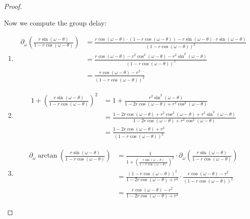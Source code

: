 \begin{proof}
\begin{enumerate}
              Now we compute the group delay:
              \begin{enumerate}[label = Step \arabic*., align = left]
                  \item
                        \begin{align*}
                            \partial_{\omega} \left(\frac{r \sin(\omega - \theta)}{1 - r \cos (\omega - \theta)} \right)
                             & = \frac{r \cos(\omega - \theta) \cdot (1 - r \cos(\omega - \theta)) - r\sin(\omega - \theta) \cdot r\sin(\omega - \theta)}{(1-r\cos(\omega - \theta))^2}
                            \\ &= \frac{r \cos(\omega - \theta) - r^2 \cos^2(\omega - \theta) - r^2 \sin^2(\omega - \theta)}{(1-r\cos(\omega - \theta))^2}
                            \\ &= \frac{r \cos(\omega - \theta) - r^2}{(1-r\cos(\omega - \theta))^2}
                        \end{align*}
                  \item
                        \begin{align*}
                            1 + \left(\frac{r \sin(\omega - \theta)}{1 - r \cos (\omega - \theta)} \right)^2
                             & = 1 + \frac{r^2 \sin^2(\omega - \theta)}{1 - 2r \cos (\omega - \theta) + r^2 \cos^2 (\omega - \theta)}
                            \\ &= \frac{1 - 2r \cos (\omega - \theta) + r^2 \cos^2 (\omega - \theta) + r^2 \sin^2(\omega - \theta)}{1 - 2r \cos (\omega - \theta) + r^2 \cos^2 (\omega - \theta)}
                            \\ &= \frac{1 - 2r \cos (\omega - \theta) + r^2}{(1 - r \cos (\omega - \theta))^2}
                        \end{align*}
                  \item
                        \begin{align*}
                            \partial_{\omega} \arctan \left(\frac{r \sin(\omega - \theta)}{1 - r \cos (\omega - \theta)}\right)
                             & = \frac{1}{1 + \left(\frac{r \sin(\omega - \theta)}{1 - r \cos (\omega - \theta)}\right)^2} \cdot \partial_{\omega} \left(\frac{r \sin(\omega - \theta)}{1 - r \cos (\omega - \theta)}\right)
                            \\ &= \frac{(1 - r \cos (\omega - \theta))^2}{1 - 2r \cos (\omega - \theta) + r^2} \cdot \frac{r \cos(\omega - \theta) - r^2}{(1 - r\cos(\omega - \theta))^2}
                            \\ &= \frac{r \cos(\omega - \theta) - r^2}{1 - 2r \cos (\omega - \theta) + r^2}

\end{align*}
\end{enumerate}
\end{enumerate}
\end{proof}
